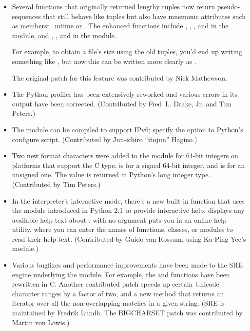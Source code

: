 \documentclass{howto}
\begin{document}
\begin{itemize}
  \item Several functions that originally returned lengthy tuples now
  return pseudo-sequences that still behave like tuples but also have
  mnemonic attributes such as member{st_mtime} or .
  The enhanced functions include ,
  , , and 
  in the  module, and ,
  , and  in the 
  module.  
  
  For example, to obtain a file's size using the old tuples, you'd end
  up writing something like , but now this can be written more
  clearly as .

   The original patch for this feature was contributed by Nick Mathewson.

  \item The Python profiler has been extensively reworked and various
  errors in its output have been corrected.  (Contributed by
  Fred~L. Drake, Jr. and Tim Peters.)
 
  \item The  module can be compiled to support IPv6;
  specify the  option to Python's configure
  script.  (Contributed by Jun-ichiro ``itojun'' Hagino.)

  \item Two new format characters were added to the 
  module for 64-bit integers on platforms that support the C
   type.   is for a signed 64-bit integer,
  and  is for an unsigned one.  The value is returned in
  Python's long integer type.  (Contributed by Tim Peters.)

  \item In the interpreter's interactive mode, there's a new built-in
  function  that uses the  module
  introduced in Python 2.1 to provide interactive help.
   displays any available help text about
  .   with no argument puts you in an online
  help utility, where you can enter the names of functions, classes,
  or modules to read their help text.
  (Contributed by Guido van Rossum, using Ka-Ping Yee's  module.)

  \item Various bugfixes and performance improvements have been made
  to the SRE engine underlying the  module.  For example,
  the  and  functions have
  been rewritten in C.  Another contributed patch speeds up certain
  Unicode character ranges by a factor of two, and a new  
  method that returns an iterator over all the non-overlapping matches in 
  a given string. 
  (SRE is maintained by
  Fredrik Lundh.  The BIGCHARSET patch was contributed by Martin von
  L\"owis.)


\end{itemize}
\end{document}
